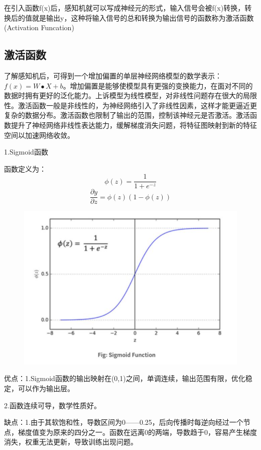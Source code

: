 \documentclass[openbib]{article}
\begin{document}
在引入函数f(x)后，感知机就可以写成神经元的形式，输入信号会被f(x)转换，转换后的值就是输出y，这种将输入信号的总和转换为输出信号的函数称为激活函数(Activation Funcation)

\subsection{激活函数}
了解感知机后，可得到一个增加偏置的单层神经网络模型的数学表示：$f(x)=W \bullet X+b$。增加偏置是能够使模型具有更强的变换能力，在面对不同的数据时拥有更好的泛化能力。上诉模型为线性模型，对非线性问题存在很大的局限性。激活函数一般是非线性的，为神经网络引入了非线性因素，这样才能更逼近更复杂的数据分布。激活函数也限制了输出的范围，控制该神经元是否激活。激活函数提升了神经网络非线性表达能力，缓解梯度消失问题，将特征图映射到新的特征空间以加速网络收敛。

\begin{center}
	1.Sigmoid函数
\end{center}
函数定义为：
$$\phi(z) = \frac{1}{1+e^{-z}}$$
$$\frac{\partial y}{\partial z}=\phi(z)(1-\phi(z))$$
\begin{figure}[htbp]
	\centering
	\includegraphics[scale=0.4]{Sigmoid.jpg}
\end{figure}

优点：1.Sigmoid函数的输出映射在(0,1)之间，单调连续，输出范围有限，优化稳定，可以作为输出层。

2.函数连续可导，数学性质好。

缺点：1.由于其软饱和性，导数区间为0——0.25，后向传播时每逆向经过一个节点，梯度值变为原来的四分之一。函数在远离0的两端，导数趋于0，容易产生梯度消失，权重无法更新，导致训练出现问题。
\end{document}
